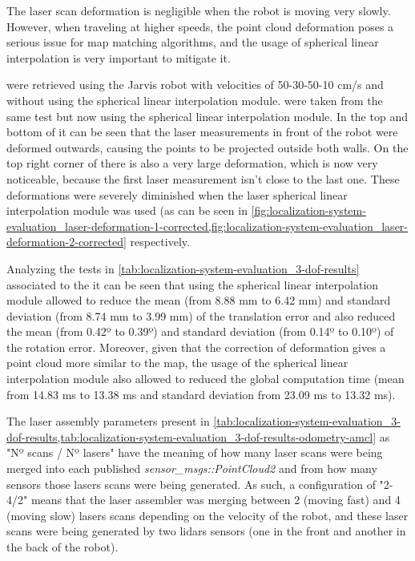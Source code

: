 The laser scan deformation is negligible when the robot is moving very slowly. However, when traveling at higher speeds, the point cloud deformation poses a serious issue for map matching algorithms, and the usage of spherical linear interpolation is very important to mitigate it.

 were retrieved using the Jarvis robot with velocities of 50-30-50-10 cm/s and without using the spherical linear interpolation module.  were taken from the same test but now using the spherical linear interpolation module. In the top and bottom of  it can be seen that the laser measurements in front of the robot were deformed outwards, causing the points to be projected outside both walls. On the top right corner of  there is also a very large deformation, which is now very noticeable, because the first laser measurement isn't close to the last one. These deformations were severely diminished when the laser spherical linear interpolation module was used (as can be seen in \cref{fig:localization-system-evaluation_laser-deformation-1-corrected,fig:localization-system-evaluation_laser-deformation-2-corrected} respectively.

Analyzing the tests in \cref{tab:localization-system-evaluation_3-dof-results} associated to the  it can be seen that using the spherical linear interpolation module allowed to reduce the mean (from 8.88 mm to 6.42 mm) and standard deviation (from 8.74 mm to 3.99 mm) of the translation error and also reduced the mean (from 0.42º to 0.39º) and standard deviation (from 0.14º to 0.10º) of the rotation error. Moreover, given that the correction of deformation gives a point cloud more similar to the map, the usage of the spherical linear interpolation module also allowed to reduced the global computation time (mean from 14.83 ms to 13.38 ms and standard deviation from 23.09 ms to 13.32 ms).

The laser assembly parameters present in \cref{tab:localization-system-evaluation_3-dof-results,tab:localization-system-evaluation_3-dof-results-odometry-amcl} as "Nº scans / Nº lasers" have the meaning of how many laser scans were being merged into each published \emph{sensor\_msgs::PointCloud2} and from how many sensors those lasers scans were being generated. As such, a configuration of "2-4/2" means that the laser assembler was merging between 2 (moving fast) and 4 (moving slow) lasers scans depending on the velocity of the robot, and these laser scans were being generated by two \glspl{lidar} sensors (one in the front and another in the back of the robot).


